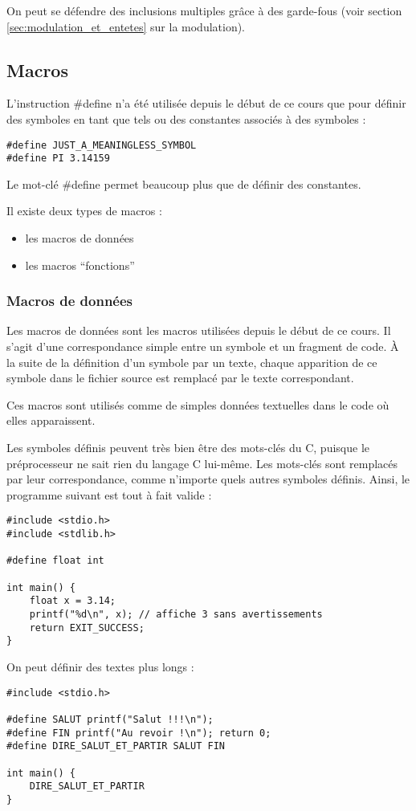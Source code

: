 \documentclass[../../../main.tex]{subfiles}
\begin{document}
On peut se défendre des inclusions multiples grâce à des garde-fous (voir section \ref{sec:modulation_et_entetes} sur la modulation).
\subsection{Macros} \label{sub:macros}
L'instruction \textsf{\#define} n'a été utilisée depuis le début de ce cours que pour définir des symboles en tant que tels ou des constantes associés à des symboles :
\begin{verbatim}
#define JUST_A_MEANINGLESS_SYMBOL
#define PI 3.14159
\end{verbatim}
Le mot-clé \textsf{\#define} permet beaucoup plus que de définir des constantes.

Il existe deux types de macros :
\begin{itemize}
	\item les macros de données
	\item les macros ``fonctions''
\end{itemize}
\subsubsection{Macros de données}\label{ssub:macros_donnees}
Les macros de données sont les macros utilisées depuis le début de ce cours. Il s'agit d'une correspondance simple entre un symbole et un fragment de code. À la suite de la définition d'un symbole par un texte, chaque apparition de ce symbole dans le fichier source est remplacé par le texte correspondant.

Ces macros sont utilisés comme de simples données textuelles dans le code où elles apparaissent.

Les symboles définis peuvent très bien être des mots-clés du C, puisque le préprocesseur ne sait rien du langage C lui-même. Les mots-clés sont remplacés par leur correspondance, comme n'importe quels autres symboles définis. Ainsi, le programme suivant est tout à fait valide :
\begin{verbatim}
#include <stdio.h>
#include <stdlib.h>

#define float int

int main() {
	float x = 3.14;
	printf("%d\n", x); // affiche 3 sans avertissements
	return EXIT_SUCCESS;
}
\end{verbatim}
On peut définir des textes plus longs :
\begin{verbatim}
#include <stdio.h>

#define SALUT printf("Salut !!!\n");
#define FIN printf("Au revoir !\n"); return 0;
#define DIRE_SALUT_ET_PARTIR SALUT FIN

int main() {
	DIRE_SALUT_ET_PARTIR
}
\end{verbatim}
\end{document}
